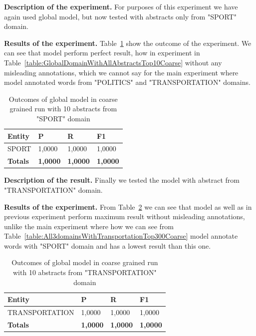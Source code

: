 \documentclass[thesis=M,english]{FITthesis}[2018/05/30]
\begin{document}
	\textbf{Description of the experiment.} For purposes of this experiment we have again used global model, but now tested with abstracts only from "SPORT" domain. 
	
	\textbf{Results of the experiment.} Table~\ref{table:GlobalDomainWithSportTop10Coarse} show the outcome of the experiment. We can see that model perform perfect result, how in experiment in Table~\ref{table:GlobalDomainWithAllAbstractsTop10Coarse} without any misleading annotations, which we cannot say for the main experiment where model annotated words from "POLITICS" and "TRANSPORTATION" domains. 
	
	\begin{table}[H]\centering
		\begin{tabular}{|l|l|l|l|}
			\hline {\textbf{Entity}} & {\textbf{P}} & {\textbf{R}} & {\textbf{F1}}\\\hline
				SPORT & 1,0000 & 1,0000 & 1,0000\\\hline
				\textbf{Totals} & \textbf{1,0000} & \textbf{1,0000} & \textbf{1,0000}\\\hline
		\end{tabular}
		\caption{Outcomes of global model in coarse grained run with 10 abstracts from "SPORT" domain \label{table:GlobalDomainWithSportTop10Coarse}}	
	\end{table}	

	\textbf{Description of the result.} Finally we tested the model with abstract from "TRANSPORTATION" domain. 
	
	\textbf{Results of the experiment.} From Table~\ref{table:GlobalDomainWithTransportationTop10Coarse} we can see that model as well as in previous experiment perform maximum result without misleading annotations, unlike the main experiment where how we can see from Table~\ref{table:All3domainsWithTransportationTop300Coarse} model annotate words with "SPORT" domain and has a lowest result than this one.
	
	\begin{table}[H]\centering
		\begin{tabular}{|l|l|l|l|}
			\hline {\textbf{Entity}} & {\textbf{P}} & {\textbf{R}} & {\textbf{F1}}\\\hline
				TRANSPORTATION & 1,0000 & 1,0000 & 1,0000\\\hline
				\textbf{Totals} & \textbf{1,0000} & \textbf{1,0000} & \textbf{1,0000}\\\hline
		\end{tabular}
		\caption{Outcomes of global model in coarse grained run with 10 abstracts from "TRANSPORTATION" domain \label{table:GlobalDomainWithTransportationTop10Coarse}}	
	\end{table}
\end{document}
